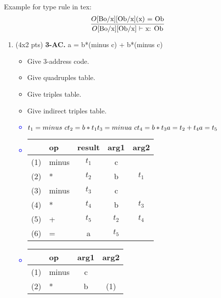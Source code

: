 \documentclass[10pt]{article}
\newcommand{\infertext}[2]{\infer{{\textrm{#1}}}{#2}}
\begin{document}
Example for type rule in tex:
\[\infertext
    {$O$[Bo/x][Ob/x] $\vdash$ x: Ob}
    {\textrm{$O$[Bo/x][Ob/x](x) = Ob}}
\]
\begin{enumerate}
    \item (4x2 pts) \textbf{3-AC.} a = b*(minus c) + b*(minus c)
          \begin{itemize}
              \item Give 3-address code.
              \item Give quadruples table.
              \item Give triples table.
              \item Give indirect triples table.
          \end{itemize}
          \textcolor{blue}{
              \begin{itemize}
                  \item $t_1=minus\ c\\t_2=b*t_1\\t_3=minua\ c\\t_4=b*t_3\\a=t_2+t_4\\a=t_5$
                  \item
                        \begin{tabular}{c|l|c|c|c}
                                & op    & result & arg1  & arg2  \\
                            \hline
                            (1) & minus & $t_1$  & c             \\
                            (2) & *     & $t_2$  & b     & $t_1$ \\
                            (3) & minus & $t_3$  & c             \\
                            (4) & *     & $t_4$  & b     & $t_3$ \\
                            (5) & +     & $t_5$  & $t_2$ & $t_4$ \\
                            (6) & =     & a      & $t_5$ &
                        \end{tabular}
                  \item
                        \begin{tabular}{c|l|c|c}
                                & op    & arg1 & arg2 \\
                            \hline
                            \hline
                            (1) & minus & c           \\
                            (2) & *     & b    & (1)  \\

\end{tabular}
\end{itemize}}
\end{enumerate}
\end{document}
